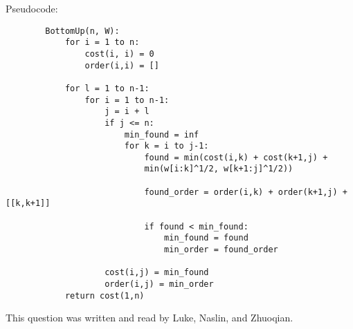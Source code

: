 \documentclass[12pt]{article}
\begin{document}
\begin{enumerate}
    Pseudocode:
    \begin{verbatim}
        BottomUp(n, W):
            for i = 1 to n:
                cost(i, i) = 0
                order(i,i) = []
            
            for l = 1 to n-1:
                for i = 1 to n-1:
                    j = i + l
                    if j <= n:
                        min_found = inf
                        for k = i to j-1:
                            found = min(cost(i,k) + cost(k+1,j) + 
                            min(w[i:k]^1/2, w[k+1:j]^1/2))

                            found_order = order(i,k) + order(k+1,j) + [[k,k+1]]

                            if found < min_found:
                                min_found = found
                                min_order = found_order

                    cost(i,j) = min_found
                    order(i,j) = min_order
            return cost(1,n)
    \end{verbatim}

    This question was written and read by  Luke, Naslin, and Zhuoqian.
 \end{enumerate}
\end{document}
